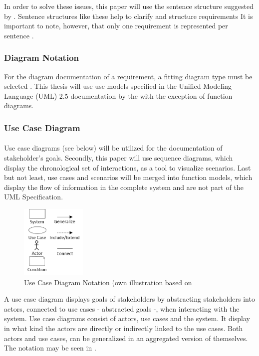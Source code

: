 In order to solve these issues, this paper will use the sentence structure suggested by \textcites[107]{Ebert.2014}[246]{Pohl.2007}. Sentence structures like these help to clarify and structure requirements It is important to note, however, that only one requirement is represented per sentence \parencite[107]{Ebert.2014}. 


\subsubsection{Diagram Notation}
For the diagram documentation of a requirement, a fitting diagram type must be selected \parencite[299]{Pohl.2007}. This thesis will use use models specified in the Unified Modeling Language (UML) 2.5 documentation by the \textcite{ObjectManagementGroup.01.03.2015} with the exception of function diagrams. 


\subsubsection{Use Case Diagram}

\paragraph{\label{par:useCaes}}
Use case diagrams (see below) will be utilized for the documentation of stakeholder's goals. Secondly, this paper will use sequence diagrams, which display the chronological set of interactions, as a tool to visualize scenarios. Last but not least, use cases and scenarios will be merged into function models, which display the flow of information in the complete system and are not part of the UML Specification. 

\begin{figure}[H] 
    \centering
    \includegraphics[width=0.28\textwidth]{img/ucSymb.png}
    \caption[Use Case Diagram Notation]{Use Case Diagram Notation (own illustration based on \cite[163]{Pohl.2007}}\label{fig:ucSymb}
\end{figure}

A use case diagram displays goals of stakeholders by abstracting stakeholders into actors, connected to use cases - abstracted goals -, when interacting with the system. Use case diagrams consist of actors, use cases and the system. It display in what kind the actors are directly or indirectly linked to the use cases. Both actors and use cases, can be generalized in an aggregated version of themselves. The notation may be seen in .

